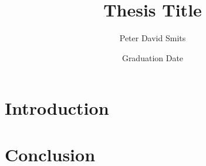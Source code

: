 \documentclass{ucetd}  %
\title{Thesis Title}
\author{Peter David Smits}
\date{Graduation Date}
\begin{document}
\maketitle

\makecopyright
\makededication
\makeepigraph


\tableofcontents
\listoffigures
\listoftables

\acknowledgments

\abstract

\mainmatter

\chapter{Introduction}







\chapter{Conclusion}

\makebibliography

%
%
\end{document}
